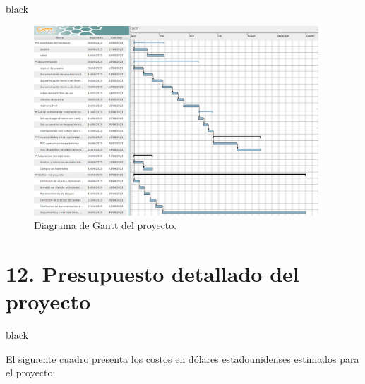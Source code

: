 \documentclass[
11pt, %
]{charter}
\begin{document}
\begin{consigna}{black}
\begin{figure}[htpb]
\centering 
\includegraphics[width=0.95\textwidth]{./Figuras/gantt-part-2.png}
\caption{Diagrama de Gantt del proyecto.}
\label{fig:diagGantt}
\end{figure}

\end{consigna}

\section{12. Presupuesto detallado del proyecto}
\label{sec:presupuesto}

\begin{consigna}{black}

El siguiente cuadro presenta los costos en dólares estadounidenses estimados para el proyecto:

\end{consigna}
\end{document}
